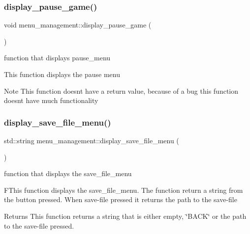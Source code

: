 \subsubsection{\texorpdfstring{display\+\_\+pause\+\_\+game()}{display\_pause\_game()}}
{\footnotesize\ttfamily void menu\+\_\+management\+::display\+\_\+pause\+\_\+game (\begin{DoxyParamCaption}{ }\end{DoxyParamCaption})}



function that displays pause\+\_\+menu 

This function displays the pause menu

\begin{DoxyNote}{Note}
This function doesn\textquotesingle{}t have a return value, because of a bug this function doesn\textquotesingle{}t have much functionality 
\end{DoxyNote}
\mbox{\label{classmenu__management_ac64c1eace3d955be8623a1129597dc54}} 
\subsubsection{\texorpdfstring{display\+\_\+save\+\_\+file\+\_\+menu()}{display\_save\_file\_menu()}}
{\footnotesize\ttfamily std\+::string menu\+\_\+management\+::display\+\_\+save\+\_\+file\+\_\+menu (\begin{DoxyParamCaption}{ }\end{DoxyParamCaption})}



function that displays the save\+\_\+file\+\_\+menu 

F\+This function displays the save\+\_\+file\+\_\+menu. The function return a string from the button pressed. When save-\/file pressed it returns the path to the save-\/file

\begin{DoxyReturn}{Returns}
This function returns a string that is either empty, \char`\"{}\+B\+A\+C\+K\char`\"{} or the path to the save-\/file pressed. 
\end{DoxyReturn}
\mbox{\label{classmenu__management_aad6e975e03cab2478f3ebec8da7eaf7d}} 

